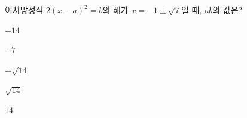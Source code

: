 이차방정식 $2(x-a)^2=b$의 해가 $x=-1\pm\sqrt{7}$일 때, $ab$의 값은? 
\begin{choices32}{\rule[-3ex]{0pt}{8ex}$-14$}{\rule[-3ex]{0pt}{8ex}$-7$}{\rule[-3ex]{0pt}{8ex}$-\sqrt{14}$}{\rule[-3ex]{0pt}{8ex}$\sqrt{14}$}{\rule[-3ex]{0pt}{8ex}$14$}\end{choices32}
